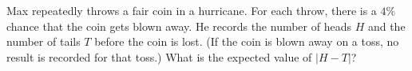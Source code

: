 Max repeatedly throws a fair coin in a hurricane. For each throw, there is a $4\%$ chance that the coin gets blown away. He records the number of heads $H$ and the number of tails $T$ before the coin is lost. (If the coin is blown away on a toss, no result is recorded for that toss.) What is the expected value of $|H-T|$?

